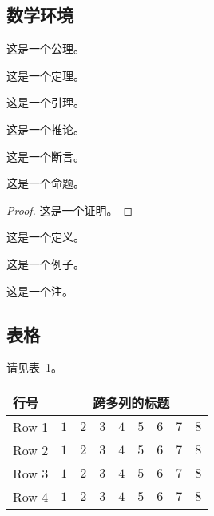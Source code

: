 \subsection{数学环境}

\begin{axiom}
   这是一个公理。 
\end{axiom}
\begin{theorem}
   这是一个定理。 
\end{theorem}
\begin{lemma}
   这是一个引理。 
\end{lemma}
\begin{corollary}
   这是一个推论。 
\end{corollary}
\begin{assertion}
   这是一个断言。 
\end{assertion}
\begin{proposition}
   这是一个命题。 
\end{proposition}
\begin{proof}
    这是一个证明。
\end{proof}
\begin{definition}
    这是一个定义。
\end{definition}
\begin{example}
    这是一个例子。
\end{example}
\begin{remark}
    这是一个注。
\end{remark}

\subsection{表格}

请见表~\ref{tab:sample}。
\begin{table}[!htbp]
    \label{tab:sample}
    \centering
    \footnotesize%
    \setlength{\tabcolsep}{4pt}%
    \renewcommand{\arraystretch}{1.2}%
    \begin{tabular}{lcccccccc}
        \hline
        行号 & \multicolumn{8}{c}{跨多列的标题}\\
        \hline
        Row 1 & $1$ & $2$ & $3$ & $4$ & $5$ & $6$ & $7$ & $8$\\
        Row 2 & $1$ & $2$ & $3$ & $4$ & $5$ & $6$ & $7$ & $8$\\
        Row 3 & $1$ & $2$ & $3$ & $4$ & $5$ & $6$ & $7$ & $8$\\
        Row 4 & $1$ & $2$ & $3$ & $4$ & $5$ & $6$ & $7$ & $8$\\
        \hline
    \end{tabular}
\end{table}

